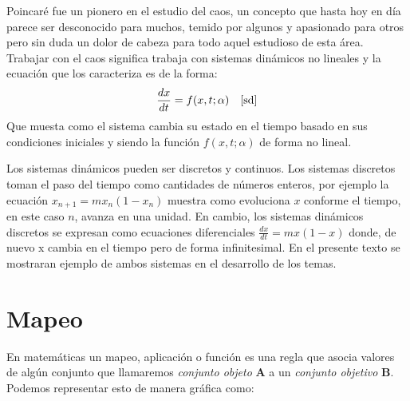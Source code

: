 \documentclass[11pt,twocolumn,spanish]{article}
\theoremstyle{definition}
\theoremstyle{remark}
\begin{document}
Poincaré fue un pionero en el estudio del caos, un concepto que hasta hoy en día parece ser desconocido para muchos, temido por algunos y apasionado para otros pero sin duda un dolor de cabeza para todo aquel estudioso de esta área. Trabajar con el caos significa trabaja con sistemas dinámicos no lineales y la ecuación que los caracteriza es de la forma:
\begin{equation}
\frac{dx}{dt} = f(x,t;\alpha)  \quad \cite{sd}
\end{equation}
Que muesta como el sistema cambia su estado en el tiempo basado en sus condiciones iniciales y siendo la función $f(x,t;\alpha)$ de forma no lineal.

Los sistemas dinámicos pueden ser discretos y continuos.  Los sistemas discretos toman el paso del tiempo como cantidades de números enteros, por ejemplo la ecuación $x_{n+1} = mx_{n}(1-x_{n})$ muestra como evoluciona $x$ conforme el tiempo, en este caso  $n$, avanza en una unidad. En cambio, los sistemas dinámicos discretos se expresan como ecuaciones diferenciales $\frac{dx}{dt} = mx(1-x)$ donde, de nuevo x cambia en el tiempo pero de forma infinitesimal. En el presente texto se mostraran ejemplo de ambos sistemas en el desarrollo de los temas.
\section{Mapeo}\label{sec:nada}
En matemáticas un mapeo, aplicación o  función es una regla que asocia valores de algún conjunto que llamaremos \textit{conjunto objeto} \textbf{A} a un \textit{conjunto objetivo} \textbf{B}. Podemos representar esto de manera gráfica como:
\end{document}
